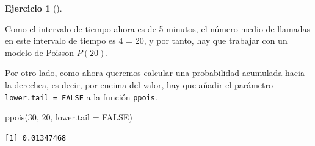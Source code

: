 \documentclass[
  a4paper,
]{scrreport}
\newenvironment{Shaded}{\begin{snugshade}}{\end{snugshade}}
\newcommand{\AttributeTok}[1]{\textcolor[rgb]{0.40,0.45,0.13}{#1}}
\newcommand{\ConstantTok}[1]{\textcolor[rgb]{0.56,0.35,0.01}{#1}}
\newcommand{\DecValTok}[1]{\textcolor[rgb]{0.68,0.00,0.00}{#1}}
\newcommand{\FunctionTok}[1]{\textcolor[rgb]{0.28,0.35,0.67}{#1}}
\newcommand{\NormalTok}[1]{\textcolor[rgb]{0.00,0.23,0.31}{#1}}
\theoremstyle{definition}
\newtheorem{exercise}{Ejercicio}[chapter]
\theoremstyle{remark}
\begin{document}
\begin{exercise}[]
\begin{enumerate}
  \begin{tcolorbox}[enhanced jigsaw, coltitle=black, left=2mm, colback=white, leftrule=.75mm, toptitle=1mm, breakable, bottomrule=.15mm, titlerule=0mm, bottomtitle=1mm, title=\textcolor{quarto-callout-tip-color}{\faLightbulb}\hspace{0.5em}{Solución}, arc=.35mm, toprule=.15mm, rightrule=.15mm, colframe=quarto-callout-tip-color-frame, opacityback=0, colbacktitle=quarto-callout-tip-color!10!white, opacitybacktitle=0.6]

  Como el intervalo de tiempo ahora es de 5 minutos, el número medio de
  llamadas en este intervalo de tiempo es 4 = 20, y por tanto,
  hay que trabajar con un modelo de Poisson \(P(20)\).

  Por otro lado, como ahora queremos calcular una probabilidad acumulada
  hacia la derechea, es decir, por encima del valor, hay que añadir el
  parámetro \texttt{lower.tail\ =\ FALSE} a la función \texttt{ppois}.

\begin{Shaded}
\begin{Highlighting}[]
\FunctionTok{ppois}\NormalTok{(}\DecValTok{30}\NormalTok{, }\DecValTok{20}\NormalTok{, }\AttributeTok{lower.tail =} \ConstantTok{FALSE}\NormalTok{)}
\end{Highlighting}
\end{Shaded}

\begin{verbatim}
[1] 0.01347468
\end{verbatim}

  \end{tcolorbox}
\end{enumerate}

\end{exercise}
\end{document}
